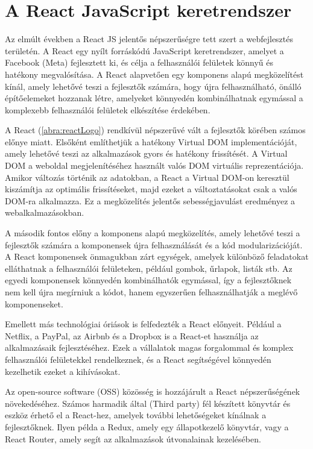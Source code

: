\section {A React JavaScript keretrendszer}

Az elmúlt években a React JS jelentős népszerűségre tett szert a webfejlesztés területén. A React egy nyílt forráskódú JavaScript keretrendszer, amelyet a Facebook (Meta) fejlesztett ki, és célja a felhasználói felületek könnyű és hatékony megvalósítása. A React alapvetően egy komponens alapú megközelítést kínál, amely lehetővé teszi a fejlesztők számára, hogy újra felhasználható, önálló építőelemeket hozzanak létre, amelyeket könnyedén kombinálhatnak egymással a komplexebb felhasználói felületek elkészítése érdekében.

A React (\ref{abra:reactLogo}) rendkívül népszerűvé vált a fejlesztők körében számos előnye miatt. Elsőként említhetjük a hatékony Virtual DOM implementációját, amely lehetővé teszi az alkalmazások gyors és hatékony frissítését. A Virtual DOM a weboldal megjelenítéséhez használt valós DOM virtuális reprezentációja. Amikor változás történik az adatokban, a React a Virtual DOM-on keresztül kiszámítja az optimális frissítéseket, majd ezeket a változtatásokat csak a valós DOM-ra alkalmazza. Ez a megközelítés jelentős sebességjavulást eredményez a webalkalmazásokban.

\pagebreak
A második fontos előny a komponens alapú megközelítés, amely lehetővé teszi a fejlesztők számára a komponensek újra felhasználását és a kód modularizációját. A React komponensek önmagukban zárt egységek, amelyek különböző feladatokat elláthatnak a felhasználói felületeken, például gombok, űrlapok, listák stb. Az egyedi komponensek könnyedén kombinálhatók egymással, így a fejlesztőknek nem kell újra megírniuk a kódot, hanem egyszerűen felhasználhatják a meglévő komponenseket.

Emellett más technológiai óriások is felfedezték a React előnyeit. Például a Netflix, a PayPal, az Airbnb és a Dropbox is a React-et használja az alkalmazásaik fejlesztéséhez. Ezek a vállalatok magas forgalommal és komplex felhasználói felületekkel rendelkeznek, és a React segítségével könnyedén kezelhetik ezeket a kihívásokat.

Az open-source software (OSS) közösség is hozzájárult a React népszerűségének növekedéséhez. Számos harmadik által (Third party) fél készített könyvtár és eszköz érhető el a React-hez, amelyek további lehetőségeket kínálnak a fejlesztőknek. Ilyen példa a Redux, amely egy állapotkezelő könyvtár, vagy a React Router, amely segít az alkalmazások útvonalainak kezelésében.

